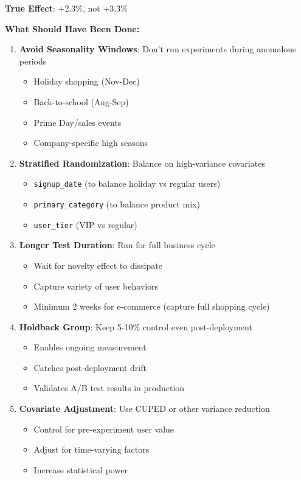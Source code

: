 \textbf{True Effect}: +2.3\%, not +3.3\%

\textbf{What Should Have Been Done:}

\begin{enumerate}
    \item \textbf{Avoid Seasonality Windows}: Don't run experiments during anomalous periods
    \begin{itemize}
        \item Holiday shopping (Nov-Dec)
        \item Back-to-school (Aug-Sep)
        \item Prime Day/sales events
        \item Company-specific high seasons
    \end{itemize}

    \item \textbf{Stratified Randomization}: Balance on high-variance covariates
    \begin{itemize}
        \item \texttt{signup\_date} (to balance holiday vs regular users)
        \item \texttt{primary\_category} (to balance product mix)
        \item \texttt{user\_tier} (VIP vs regular)
    \end{itemize}

    \item \textbf{Longer Test Duration}: Run for full business cycle
    \begin{itemize}
        \item Wait for novelty effect to dissipate
        \item Capture variety of user behaviors
        \item Minimum 2 weeks for e-commerce (capture full shopping cycle)
    \end{itemize}

    \item \textbf{Holdback Group}: Keep 5-10\% control even post-deployment
    \begin{itemize}
        \item Enables ongoing measurement
        \item Catches post-deployment drift
        \item Validates A/B test results in production
    \end{itemize}

    \item \textbf{Covariate Adjustment}: Use CUPED or other variance reduction
    \begin{itemize}
        \item Control for pre-experiment user value
        \item Adjust for time-varying factors
        \item Increase statistical power
    \end{itemize}
\end{enumerate}

